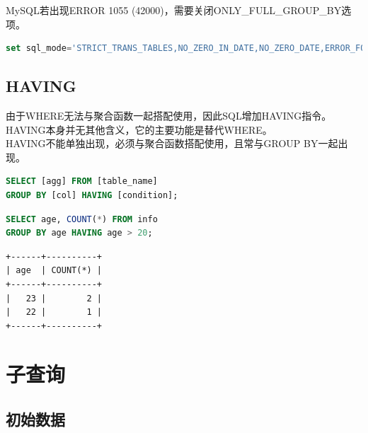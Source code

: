 \documentclass[12pt, openany, oneside]{book}
\begin{document}
MySQL若出现ERROR 1055 (42000)，需要关闭ONLY\_FULL\_GROUP\_BY选项。

\vspace{-0.5cm}

\begin{lstlisting}[language=SQL, breaklines=true, breakatwhitespace=false]
set sql_mode='STRICT_TRANS_TABLES,NO_ZERO_IN_DATE,NO_ZERO_DATE,ERROR_FOR_DIVISION_BY_ZERO,NO_ENGINE_SUBSTITUTION';
\end{lstlisting}

\vspace{0.5cm}

\section{HAVING}

由于WHERE无法与聚合函数一起搭配使用，因此SQL增加HAVING指令。HAVING本身并无其他含义，它的主要功能是替代WHERE。\\

HAVING不能单独出现，必须与聚合函数搭配使用，且常与GROUP BY一起出现。

\vspace{-0.5cm}

\begin{lstlisting}[language=SQL]
SELECT [agg] FROM [table_name]
GROUP BY [col] HAVING [condition];
\end{lstlisting}

\vspace{0.5cm}


\begin{lstlisting}[language=SQL]
SELECT age, COUNT(*) FROM info
GROUP BY age HAVING age > 20;
\end{lstlisting}

\begin{tcolorbox}
\begin{verbatim}
+------+----------+
| age  | COUNT(*) |
+------+----------+
|   23 |        2 |
|   22 |        1 |
+------+----------+
	\end{verbatim}
\end{tcolorbox}

\newpage

\chapter{子查询}

\section{初始数据}
\end{document}
